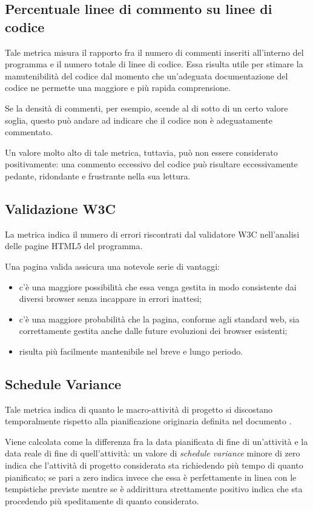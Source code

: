 \subsection{Percentuale linee di commento su linee di codice}
Tale metrica misura il rapporto fra il numero di commenti inseriti all'interno del programma e il numero totale di linee di codice. Essa risulta utile per stimare la manutenibilità del codice dal momento che un'adeguata documentazione del codice ne permette una maggiore e più rapida comprensione.

Se la densità di commenti, per esempio, scende al di sotto di un certo valore soglia, questo può andare ad indicare che il codice non è adeguatamente commentato.

Un valore molto alto di tale metrica, tuttavia, può non essere considerato positivamente: una commento eccessivo del codice può risultare eccessivamente pedante, ridondante e frustrante nella sua lettura.



\subsection{Validazione W3C}
La metrica indica il numero di errori riscontrati dal validatore W3C nell'analisi delle pagine HTML5 del programma.

Una pagina valida assicura una notevole serie di vantaggi:
\begin{itemize}
 	\item c'è una maggiore possibilità che essa venga gestita in modo consistente dai diversi browser senza incappare in errori inattesi;
 	\item c'è una maggiore probabilità che la pagina, conforme agli standard web, sia correttamente gestita anche dalle future evoluzioni dei browser esistenti;
 	\item risulta più facilmente mantenibile nel breve e lungo periodo.
\end{itemize}



\subsection{Schedule Variance}
Tale metrica indica di quanto le macro-attività di progetto si discostano temporalmente rispetto alla pianificazione originaria definita nel documento \PdP . 

Viene calcolata come la differenza fra la data pianificata di fine di un'attività e la data reale di fine di quell'attività: un valore di \emph{schedule variance} minore di zero indica che l'attività di progetto considerata sta richiedendo più tempo di quanto pianificato; se pari a zero indica invece che essa è perfettamente in linea con le tempistiche previste mentre se è addirittura strettamente positivo indica che sta procedendo più speditamente di quanto considerato. 

